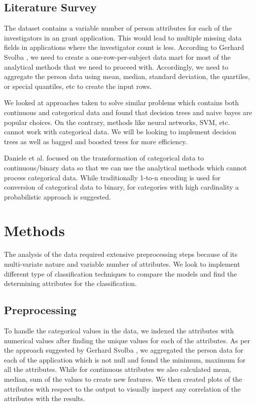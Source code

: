 \documentclass{article} %
\begin{document}
\subsection{Literature Survey}

The dataset contains a variable number of person attributes for each of the investigators in an grant application. This would lead to multiple missing data fields in applications where the investigator count is less. According to Gerhard Svolba \cite{OneRow}, we need to create a one-row-per-subject data mart for most of the analytical methods that we need to proceed with. Accordingly, we need to aggregate the person data using mean, median, standard deviation, the quartiles, or special quantiles, etc to create the input rows.

We looked at approaches taken to solve similar problems which contains both continuous and categorical data \cite{Matlab} and found that decision trees and naive bayes are popular choices. On the contrary, methods like neural networks, SVM, etc. cannot work with categorical data. We will be looking to implement decision trees as well as bagged and boosted trees for more efficiency. 

Daniele et al. \cite{HighCard} focused on the transformation of categorical data to continuous/binary data so that we can use the analytical methods which cannot process categorical data. While traditionally 1-to-n encoding is used for conversion of categorical data to binary, for categories with high cardinality a probabilistic approach is suggested.

\section{Methods}

The analysis of the data required extensive preprocessing steps because of its multi-variate nature and variable number of attributes. We look to implement different type of classification techniques to compare the models and find the determining attributes for the classification.

\subsection{Preprocessing}

To handle the categorical values in the data, we indexed the attributes with numerical values after finding the unique values for each of the attributes. As per the approach suggested by Gerhard Svolba \cite{OneRow}, we aggregated the person data for each of the application which is not null and found the minimum, maximum for all the attributes. While for continuous attributes we also calculated mean, median, sum of the values to create new features. We then created plots of the attributes with respect to the output to visually inspect any correlation of the attributes with the results.
\end{document}
